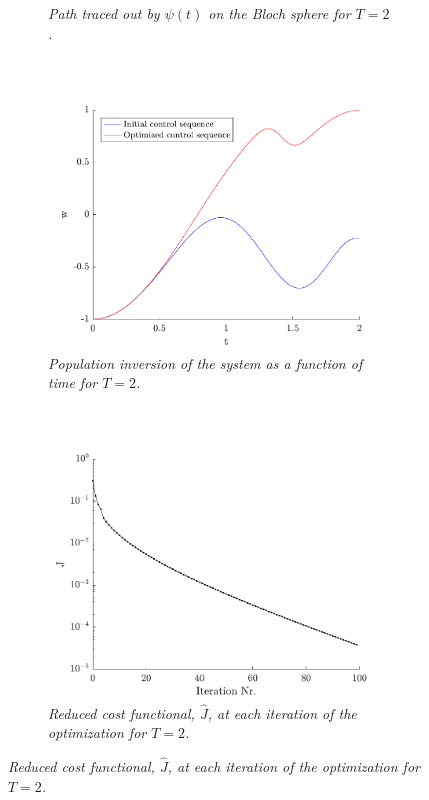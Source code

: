 \begin{figure}[h!]
\begin{subfigure}[t]{0.49\textwidth}
        \caption{\textit{Path traced out by $\psi (t)$ on the Bloch sphere for $T = 2$.}}
        \label{fig:path2}
    \end{subfigure}   
	~
    \begin{subfigure}[t]{0.49\textwidth}
        \includegraphics[width=\textwidth]{Figures/pop2.pdf}
        \caption{\textit{Population inversion of the system as a function of time for $T = 2$.}}
        \label{fig:population2}
    \end{subfigure}
    ~
    \begin{subfigure}[t]{0.49\textwidth}
        \includegraphics[width=\textwidth]{Figures/cost2.pdf}
        \caption{\textit{Reduced cost functional, $\hat{J}$, at each iteration of the optimization for $T = 2$.}}
        \label{fig:cost2}
    \end{subfigure}     
\end{figure} 
